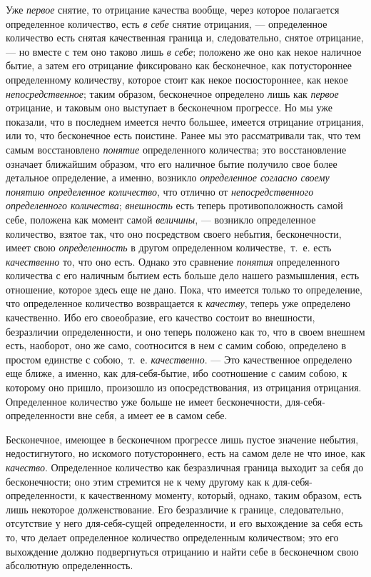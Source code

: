 Уже {\em первое} снятие, то отрицание качества вообще,
через которое полагается определенное количество, есть
{\em в себе} снятие отрицания, — определенное
количество есть снятая качественная граница и, следовательно, снятое
отрицание, — но вместе с тем оно таково лишь {\em в
себе}; положено же оно как некое наличное бытие, а затем его отрицание
фиксировано как бесконечное, как потустороннее определенному количеству,
которое стоит как некое посюстороннее, как некое
{\em непосредственное}; таким образом, бесконечное
определено лишь как {\em первое} отрицание, и таковым
оно выступает в бесконечном прогрессе. Но мы уже показали, что в последнем
имеется нечто большее, имеется отрицание отрицания, или то, что бесконечное
есть поистине. Ранее мы это рассматривали так, что тем самым восстановлено
{\em понятие} определенного количества; это
восстановление означает ближайшим образом, что его наличное бытие получило
свое более детальное определение, а именно, возникло
{\em определенное согласно своему понятию определенное
количество}, что отлично от {\em непосредственного
определенного количества}; {\em внешность} есть теперь
противоположность самой себе, положена как момент самой
{\em величины}, — возникло определенное количество,
взятое так, что оно посредством своего небытия, бесконечности, имеет свою
{\em определенность} в другом определенном
количестве,~т.~е. есть {\em качественно} то, что оно
есть. Однако это сравнение {\em понятия} определенного
количества с его наличным бытием есть больше дело нашего размышления, есть
отношение, которое здесь еще не дано. Пока, что имеется только то
определение, что определенное количество возвращается к
{\em качеству}, теперь уже определено качественно. Ибо
его своеобразие, его качество состоит во внешности, безразличии
определенности, и оно теперь положено как то, что в своем внешнем есть,
наоборот, оно же само, соотносится в нем с самим собою, определено в
простом единстве с собою,~т.~е. {\em качественно}. —
Это качественное определено еще ближе, а именно, как для-себя-бытие, ибо
соотношение с самим собою, к которому оно пришло, произошло из
опосредствования, из отрицания отрицания. Определенное количество уже
больше не имеет бесконечности, для-себя-определенности вне себя, а имеет ее
в самом себе.

Бесконечное, имеющее в бесконечном прогрессе лишь пустое значение небытия,
недостигнутого, но искомого потустороннего, есть на самом деле не что иное,
как {\em качество}. Определенное количество как
безразличная граница выходит за себя до бесконечности; оно этим стремится
не к чему другому как к для-себя-определенности, к качественному моменту,
который, однако, таким образом, есть лишь некоторое долженствование. Его
безразличие к границе, следовательно, отсутствие у него для-себя-сущей
определенности, и его выхождение за себя есть то, что делает определенное
количество определенным количеством; это его выхождение должно
подвергнуться отрицанию и найти себе в бесконечном свою абсолютную
определенность.

